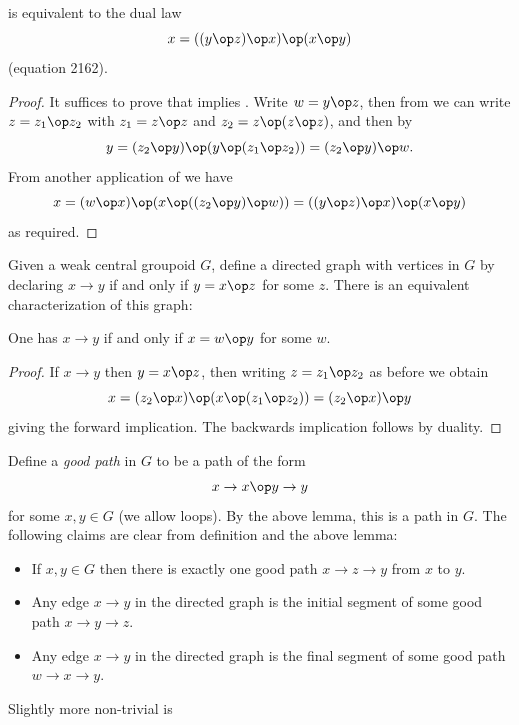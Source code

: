 \begin{lemma}[1485 equivalent to 2162]\label{1485-dual}\leanok{}
   is equivalent to the dual law
  \begin{equation}\label{2162}
   x = ((y \op z) \op x) \op (x \op y)
  \end{equation}
  (equation 2162).
\end{lemma}

\begin{proof}
  It suffices to prove that  implies . Write $w = y \op z$, then from  we can write $z = z_1 \op z_2$ with $z_1 = z \op z$ and $z_2 = z \op (z \op z)$, and then by 
  $$ y = (z_2 \op y) \op (y \op (z_1 \op z_2)) = (z_2 \op y) \op w.$$
  From another application of  we have
  $$ x = (w \op x) \op (x \op ((z_2 \op y) \op w)) = ((y \op z) \op x) \op (x \op y)$$
  as required.
\end{proof}

Given a weak central groupoid $G$, define a directed graph with vertices in $G$ by declaring $x \to y$ if and only if $y = x \op z$ for some $z$. There is an equivalent characterization of this graph:

\begin{lemma}\label{graph-dual}\leanok{}
  One has $x \to y$ if and only if $x = w \op y$ for some $w$.
\end{lemma}

\begin{proof}
  If $x \to y$ then $y = x \op z$, then writing $z = z_1 \op z_2$ as before we obtain
  $$ x = (z_2 \op x) \op (x \op (z_1 \op z_2)) = (z_2 \op x) \op y$$
  giving the forward implication. The backwards implication follows by duality.
\end{proof}

Define a \emph{good path} in $G$ to be a path of the form $$x \to x \op y \to y$$ for some $x,y \in G$ (we allow loops). By the above lemma, this is a path in $G$. The following claims are clear from definition and the above lemma:
\begin{itemize}
  \item[Claim 1:] If $x,y \in G$ then there is exactly one good path $x \to z \to y$ from $x$ to $y$.
  \item[Claim 2:] Any edge $x \to y$ in the directed graph is the initial segment of some good path $x \to y \to z$.
  \item[Claim 3:] Any edge $x \to y$ in the directed graph is the final segment of some good path $w \to x \to y$.
\end{itemize}
Slightly more non-trivial is

